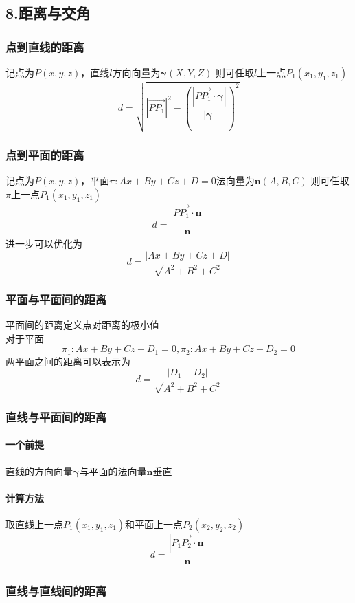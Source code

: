 \documentclass{article}
\newcommand{\ve}{\boldsymbol}
\begin{document}
\begin{CJK}{UTF8}{gkai}
\subsection*{8.距离与交角}
\subsubsection*{点到直线的距离}
记点为$P(x,y,z)$，直线$l$方向向量为$\ve{\gamma}(X,Y,Z)$
则可任取$l$上一点$P_1(x_1,y_1,z_1)$\\
\[d=\sqrt{|\overrightarrow{PP_1}|^2-(\frac{|\overrightarrow{PP_1}\cdot \ve{\gamma}|}{|\ve{\gamma}|})^2}\]

\subsubsection*{点到平面的距离}
记点为$P(x,y,z)$，平面$\pi:Ax+By+Cz+D=0$法向量为$\ve{n}(A,B,C)$
则可任取$\pi$上一点$P_1(x_1,y_1,z_1)$\\
\[d=\frac{|\overrightarrow{PP_1}\cdot \ve{n}|}{|\ve{n}|}\]
进一步可以优化为
\[d=\frac{\left|{Ax+By+Cz+D}\right|}{\sqrt{A^2+B^2+C^2}}\]
\subsubsection*{平面与平面间的距离}
平面间的距离定义点对距离的极小值\\
对于平面
\[\pi_1:Ax+By+Cz+D_1=0,\pi_2:Ax+By+Cz+D_2=0\]
两平面之间的距离可以表示为
\[d=\frac{|D_1-D_2|}{\sqrt{A^2+B^2+C^2}}\]

\subsubsection*{直线与平面间的距离}
\paragraph{一个前提\\}
直线的方向向量$\ve{\gamma}$与平面的法向量$\ve{n}$垂直\\

\paragraph{计算方法\\}
取直线上一点$P_1(x_1,y_1,z_1)$和平面上一点$P_2(x_2,y_2,z_2)$\\
\[d=\frac{|\overrightarrow{P_1P_2}\cdot \ve{n}|}{|\ve{n}|}\]

\subsubsection*{直线与直线间的距离}

\end{CJK}
\end{document}
